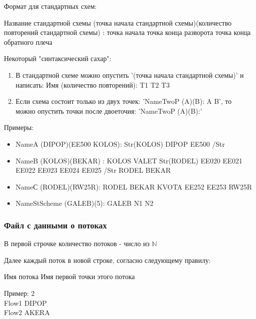 \documentclass[12pt, a4 paper]{article}
\theoremstyle{plain}
\begin{document}
\bigskip

Формат для стандартных схем:

\bigskip

\begin{center}
Название стандартной схемы (точка начала стандартной схемы)(количество повторений стандартной схемы) : точка начала точка конца разворота точка конца обратного плеча
\end{center}

\bigskip

Некоторый "синтаксический сахар":

\begin{enumerate}
	\item В стандартной схеме можно опустить '(точка начала стандартной схемы)' и написать: Имя (количество повторений): T1 T2 T3
	\item Если схема состоит только из двух точек: 'NameTwoP (A)(B): A B', то можно опустить точки после двоеточия: 'NameTwoP (A)(B):'
\end{enumerate}

Примеры:
\begin{itemize}
	\item NameA (DIPOP)(EE500 KOLOS): Str(KOLOS) DIPOP EE500 /Str
	\item NameB (KOLOS)(BEKAR) : KOLOS VALET Str(RODEL) EE020 EE021 EE022 EE023 EE024 EE025 /Str RODEL BEKAR
	\item NameС (RODEL)(RW25R): RODEL BEKAR KVOTA EE252 EE253 RW25R
	\item NameStScheme (GALEB)(5): GALEB N1 N2
\end{itemize}


\subsubsection{Файл с данными о потоках}

В первой строчке количество потоков - число из $\mathbb{N}$

Далее каждый  поток в новой строке, согласно следующему правилу:

\begin{center}
Имя потока  Имя первой точки этого потока
\end{center}

Пример:
2\\
Flow1 DIPOP\\
Flow2 AKERA
\end{document}
